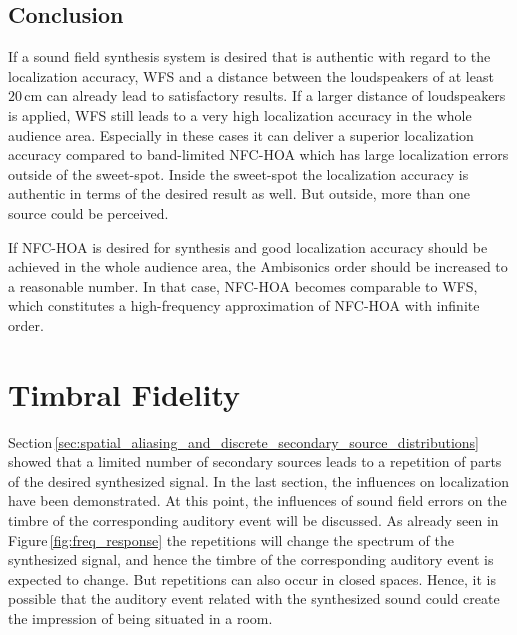 \subsection{Conclusion}
\label{sec:localization_conclusion}
%
If a sound field synthesis system is desired that is authentic with regard to the
localization accuracy, \ac{WFS} and a
distance between the loudspeakers of at least $20$\,cm can already lead to
satisfactory results.
If a larger distance of loudspeakers is applied, \ac{WFS} still leads to a very
high localization accuracy in the whole audience area. Especially in these cases
it can deliver a superior localization accuracy compared to band-limited
\ac{NFC-HOA} which has large localization errors outside of the sweet-spot.
Inside the sweet-spot the localization accuracy is authentic in terms of the
desired result as well.
But outside, more than one source could be perceived. 

If \ac{NFC-HOA} is desired for synthesis and good localization
accuracy should be achieved in the whole audience area, the Ambisonics order
should be increased to a reasonable number. In that case,
\ac{NFC-HOA} becomes comparable to \ac{WFS}, which constitutes a high-frequency
approximation of \ac{NFC-HOA} with infinite order.



\section[Timbral Fidelity]{Timbral Fidelity\autocite[This experiment
was published in a slightly modified way in][the presented experiment was carried
out in coorperation with Christoph Hohnerlein as part of his Bachelor
thesis]{Wierstorf2014}}
\label{sec:timbral_fidelity}

Section\,\ref{sec:spatial_aliasing_and_discrete_secondary_source_distributions}
showed that a limited number of secondary sources leads to a repetition of parts
of the desired synthesized signal. In the last section, the
influences on localization have been demonstrated. At this point, the influences
of sound field errors on the
timbre of the corresponding auditory event will be discussed. As already seen in
Figure\,\ref{fig:freq_response} the repetitions will change the spectrum of the
synthesized signal, and hence the timbre of the corresponding auditory event
is expected to change. But repetitions can also occur in closed spaces.
Hence, it is possible that the auditory event related with the
synthesized sound could create the impression of being situated in a room.

